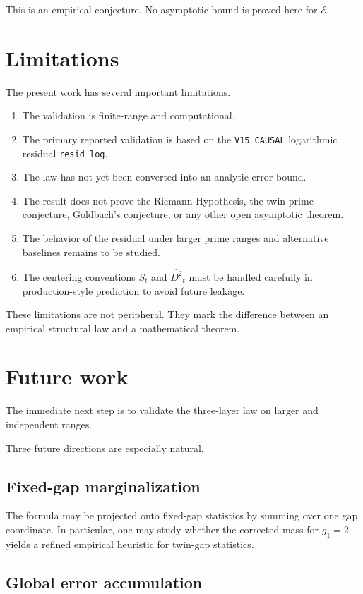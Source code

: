 \documentclass[11pt]{article}
\begin{document}
This is an empirical conjecture. No asymptotic bound is proved here for \(\mathcal{E}\).

\section{Limitations}

The present work has several important limitations.
\begin{enumerate}[label=\arabic*.]
\item The validation is finite-range and computational.
\item The primary reported validation is based on the \texttt{V15\_CAUSAL} logarithmic residual \texttt{resid\_log}.
\item The law has not yet been converted into an analytic error bound.
\item The result does not prove the Riemann Hypothesis, the twin prime conjecture, Goldbach's conjecture, or any other open asymptotic theorem.
\item The behavior of the residual under larger prime ranges and alternative baselines remains to be studied.
\item The centering conventions \(\bar S_t\) and \(\overline{D^2}_t\) must be handled carefully in production-style prediction to avoid future leakage.
\end{enumerate}

These limitations are not peripheral. They mark the difference between an empirical structural law and a mathematical theorem.

\section{Future work}

The immediate next step is to validate the three-layer law on larger and independent ranges.

Three future directions are especially natural.

\subsection{Fixed-gap marginalization}

The formula may be projected onto fixed-gap statistics by summing over one gap coordinate. In particular, one may study whether the corrected mass for \(g_1=2\) yields a refined empirical heuristic for twin-gap statistics.

\subsection{Global error accumulation}
\end{document}
